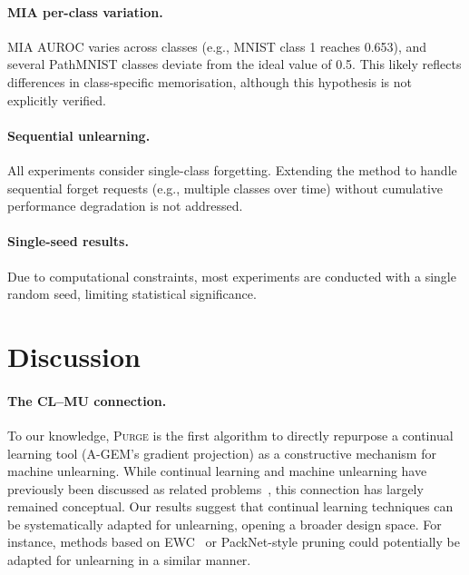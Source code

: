 \documentclass[10pt,twocolumn]{article}
\newcommand{\ours}{\textsc{Purge}}
\begin{document}
\paragraph{MIA per-class variation.}
MIA AUROC varies across classes (e.g., MNIST class 1 reaches 0.653), and several PathMNIST classes deviate from the ideal value of 0.5.
This likely reflects differences in class-specific memorisation, although this hypothesis is not explicitly verified.

\paragraph{Sequential unlearning.}
All experiments consider single-class forgetting.
Extending the method to handle sequential forget requests (e.g., multiple classes over time) without cumulative performance degradation is not addressed.

\paragraph{Single-seed results.}
Due to computational constraints, most experiments are conducted with a single random seed, limiting statistical significance.
\section{Discussion}\label{sec:discussion}

\paragraph{The CL--MU connection.}
To our knowledge, \ours{} is the first algorithm to directly repurpose a continual learning tool (A-GEM's gradient projection) as a constructive mechanism for machine unlearning.
While continual learning and machine unlearning have previously been discussed as related problems~\cite{kurmanji2023unbounded}, this connection has largely remained conceptual.
Our results suggest that continual learning techniques can be systematically adapted for unlearning, opening a broader design space.
For instance, methods based on EWC~\cite{golatkar2020eternal} or PackNet-style pruning could potentially be adapted for unlearning in a similar manner.
\end{document}
